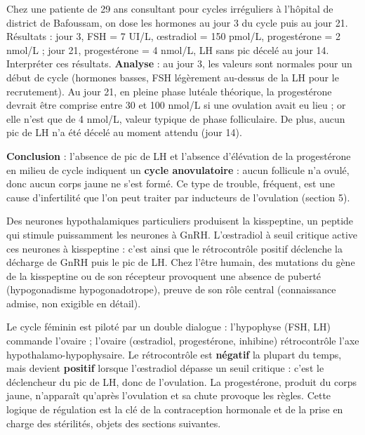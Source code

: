 \documentclass[11pt]{article}
\newcommand{\cle}[1]{{\popxbold\color{popdark}#1}}
\begin{document}
\begin{exoresolu}
Chez une patiente de 29 ans consultant pour cycles irréguliers à l'hôpital de district de Bafoussam, on dose les hormones au jour 3 du cycle puis au jour 21. Résultats : jour 3, FSH = 7 UI/L, œstradiol = 150 pmol/L, progestérone = 2 nmol/L ; jour 21, progestérone = 4 nmol/L, LH sans pic décelé au jour 14. Interpréter ces résultats.
\tcblower
\textbf{Analyse} : au jour 3, les valeurs sont normales pour un début de cycle (hormones basses, FSH légèrement au-dessus de la LH pour le recrutement). Au jour 21, en pleine phase lutéale théorique, la progestérone devrait être comprise entre 30 et 100 nmol/L si une ovulation avait eu lieu ; or elle n'est que de 4 nmol/L, valeur typique de phase folliculaire. De plus, aucun pic de LH n'a été décelé au moment attendu (jour 14).\par
\textbf{Conclusion} : l'absence de pic de LH et l'absence d'élévation de la progestérone en milieu de cycle indiquent un \textbf{cycle anovulatoire} : aucun follicule n'a ovulé, donc aucun corps jaune ne s'est formé. Ce type de trouble, fréquent, est une cause d'infertilité que l'on peut traiter par inducteurs de l'ovulation (section 5).
\end{exoresolu}

\begin{savaistu}
Des neurones hypothalamiques particuliers produisent la \cle{kisspeptine}, un peptide qui stimule puissamment les neurones à GnRH. L'œstradiol à seuil critique active ces neurones à kisspeptine : c'est ainsi que le rétrocontrôle positif déclenche la décharge de GnRH puis le pic de LH. Chez l'être humain, des mutations du gène de la kisspeptine ou de son récepteur provoquent une absence de puberté (hypogonadisme hypogonadotrope), preuve de son rôle central (connaissance admise, non exigible en détail).
\end{savaistu}

\begin{aretenir}
Le cycle féminin est piloté par un double dialogue : l'hypophyse (FSH, LH) commande l'ovaire ; l'ovaire (œstradiol, progestérone, inhibine) rétrocontrôle l'axe hypothalamo-hypophysaire. Le rétrocontrôle est \textbf{négatif} la plupart du temps, mais devient \textbf{positif} lorsque l'œstradiol dépasse un seuil critique : c'est le déclencheur du pic de LH, donc de l'ovulation. La progestérone, produit du corps jaune, n'apparaît qu'après l'ovulation et sa chute provoque les règles. Cette logique de régulation est la clé de la contraception hormonale et de la prise en charge des stérilités, objets des sections suivantes.
\end{aretenir}
\end{document}

